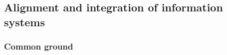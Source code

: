 \documentclass{amsart}
\theoremstyle{remark}
\theoremstyle{definition}
\begin{document}
\subsection{Alignment and integration of information systems}\label{sec:alignment}

\subsubsection{Common ground}
\end{document}

